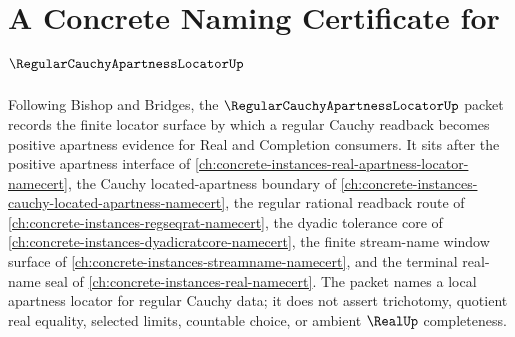 \chapter{A Concrete Naming Certificate for $\RegularCauchyApartnessLocatorUp$}
\label{ch:concrete-instances-regular-cauchy-apartness-locator-namecert}

Following Bishop and Bridges, the $\RegularCauchyApartnessLocatorUp$ packet records the finite locator surface by which a regular Cauchy readback becomes positive apartness evidence for Real and Completion consumers. It sits after the positive apartness interface of \autoref{ch:concrete-instances-real-apartness-locator-namecert}, the Cauchy located-apartness boundary of \autoref{ch:concrete-instances-cauchy-located-apartness-namecert}, the regular rational readback route of \autoref{ch:concrete-instances-regseqrat-namecert}, the dyadic tolerance core of \autoref{ch:concrete-instances-dyadicratcore-namecert}, the finite stream-name window surface of \autoref{ch:concrete-instances-streamname-namecert}, and the terminal real-name seal of \autoref{ch:concrete-instances-real-namecert}. The packet names a local apartness locator for regular Cauchy data; it does not assert trichotomy, quotient real equality, selected limits, countable choice, or ambient $\RealUp$ completeness.

